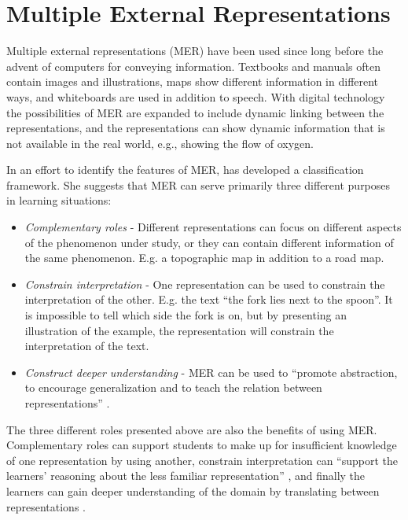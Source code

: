 
\section{Multiple External Representations}
Multiple external representations (MER) have been used since long before the advent of computers for conveying information. Textbooks and manuals often contain images and illustrations, maps show different information in different ways, and whiteboards are used in addition to speech. With digital technology the possibilities of MER are expanded to include dynamic linking between the representations, and the representations can show dynamic information that is not available in the real world, e.g., showing the flow of oxygen. 

In an effort to identify the features of MER, \citet{ainsworth1999functions} has developed a classification framework. She suggests that MER can serve primarily three different purposes in learning situations:
\begin{itemize}
\item{} \emph{Complementary roles} - Different representations can focus on different aspects of the phenomenon under study, or they can contain different information of the same phenomenon. E.g. a topographic map in addition to a road map. 
\item{} \emph{Constrain interpretation} - One representation can be used to constrain the interpretation of the other. E.g. the text “the fork lies next to the spoon”. It is impossible to tell which side the fork is on, but by presenting an illustration of the example, the representation will constrain the interpretation of the text. 
\item{} \emph{Construct deeper understanding} - MER can be used to “promote abstraction, to encourage generalization and to teach the relation between representations” \citep{ainsworth1999functions}. 
\end{itemize}

The three different roles presented above are also the benefits of using MER. Complementary roles can support students to make up for insufficient knowledge of one representation by using another, constrain interpretation can “support the learners’ reasoning about the less familiar representation” \citet{ainsworth1999functions}, and finally the learners can gain deeper understanding of the domain by translating between representations \citep{van2006supporting}. 

